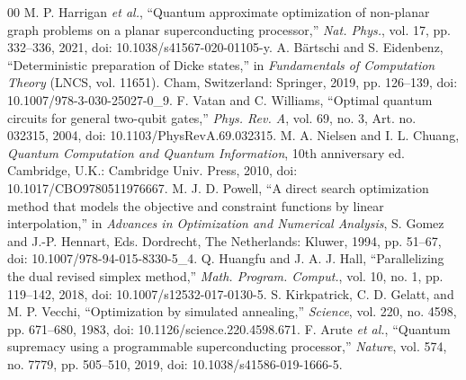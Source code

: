 \documentclass[conference]{IEEEtran}
\begin{document}
\begin{thebibliography}{00}
 M. P. Harrigan \textit{et al.}, ``Quantum approximate optimization of non-planar graph problems on a planar superconducting processor,'' \textit{Nat. Phys.}, vol. 17, pp. 332--336, 2021, doi: 10.1038/s41567-020-01105-y.
 A. B\"{a}rtschi and S. Eidenbenz, ``Deterministic preparation of Dicke states,'' in \textit{Fundamentals of Computation Theory} (LNCS, vol. 11651). Cham, Switzerland: Springer, 2019, pp. 126--139, doi: 10.1007/978-3-030-25027-0\_9.
 F. Vatan and C. Williams, ``Optimal quantum circuits for general two-qubit gates,'' \textit{Phys. Rev. A}, vol. 69, no. 3, Art. no. 032315, 2004, doi: 10.1103/PhysRevA.69.032315.
 M. A. Nielsen and I. L. Chuang, \textit{Quantum Computation and Quantum Information}, 10th anniversary ed. Cambridge, U.K.: Cambridge Univ. Press, 2010, doi: 10.1017/CBO9780511976667.
 M. J. D. Powell, ``A direct search optimization method that models the objective and constraint functions by linear interpolation,'' in \textit{Advances in Optimization and Numerical Analysis}, S. Gomez and J.-P. Hennart, Eds. Dordrecht, The Netherlands: Kluwer, 1994, pp. 51--67, doi: 10.1007/978-94-015-8330-5\_4.
 Q. Huangfu and J. A. J. Hall, ``Parallelizing the dual revised simplex method,'' \textit{Math. Program. Comput.}, vol. 10, no. 1, pp. 119--142, 2018, doi: 10.1007/s12532-017-0130-5.
 S. Kirkpatrick, C. D. Gelatt, and M. P. Vecchi, ``Optimization by simulated annealing,'' \textit{Science}, vol. 220, no. 4598, pp. 671--680, 1983, doi: 10.1126/science.220.4598.671.
 F. Arute \textit{et al.}, ``Quantum supremacy using a programmable superconducting processor,'' \textit{Nature}, vol. 574, no. 7779, pp. 505--510, 2019, doi: 10.1038/s41586-019-1666-5.
\end{thebibliography}
\end{document}
